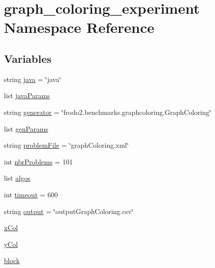 \hypertarget{namespacegraph__coloring__experiment}{}\section{graph\+\_\+coloring\+\_\+experiment Namespace Reference}
\label{namespacegraph__coloring__experiment}
\subsection*{Variables}
\begin{DoxyCompactItemize}
\item 
string \hyperlink{namespacegraph__coloring__experiment_a7feb979c3a7d45682ec6a409932ff98c}{java} = \char`\"{}java\char`\"{}
\item 
list \hyperlink{namespacegraph__coloring__experiment_a233413ce8a774f77dfc77347c2a22422}{java\+Params}
\item 
string \hyperlink{namespacegraph__coloring__experiment_a05bfb49f88b113824998d2164cc01134}{generator} = \char`\"{}frodo2.\+benchmarks.\+graphcoloring.\+Graph\+Coloring\char`\"{}
\item 
list \hyperlink{namespacegraph__coloring__experiment_a78b6e5cdb7137c3c8def933a5cce521b}{gen\+Params}
\item 
string \hyperlink{namespacegraph__coloring__experiment_aedb6fa1c7df7c8e4c786b434ba0a7737}{problem\+File} = \char`\"{}graph\+Coloring.\+xml\char`\"{}
\item 
int \hyperlink{namespacegraph__coloring__experiment_a9860a2d0dc6e3b34b1b1fea39c27c6b4}{nbr\+Problems} = 101
\item 
list \hyperlink{namespacegraph__coloring__experiment_a4327af884d507aa7e22e2173532cad85}{algos}
\item 
int \hyperlink{namespacegraph__coloring__experiment_aee221115d74dd61ff9935ccde1508ac9}{timeout} = 600
\item 
string \hyperlink{namespacegraph__coloring__experiment_aafcf91207e607e97bd185832c205fa55}{output} = \char`\"{}output\+Graph\+Coloring.\+csv\char`\"{}
\item 
\hyperlink{namespacegraph__coloring__experiment_a8764a41a0223e612930b41d906b2c624}{x\+Col}
\item 
\hyperlink{namespacegraph__coloring__experiment_ac98b859dbb9d76de8f5b6fc483ded554}{y\+Col}
\item 
\hyperlink{namespacegraph__coloring__experiment_a9cf55c744b94824ce5762bf194da03ef}{block}
\end{DoxyCompactItemize}


